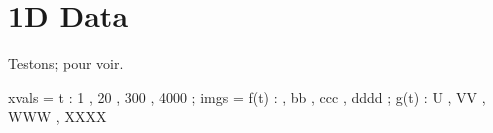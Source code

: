 \documentclass[12pt]{article}
\begin{document}


\section{1D Data}

Testons; pour voir.

\begin{functable}
    xvals =    t : 1 , 20 , 300 , 4000 ;
    imgs  = f(t) :  , bb , ccc , dddd ;
            g(t) : U , VV , WWW , XXXX
\end{functable}


\end{document}
